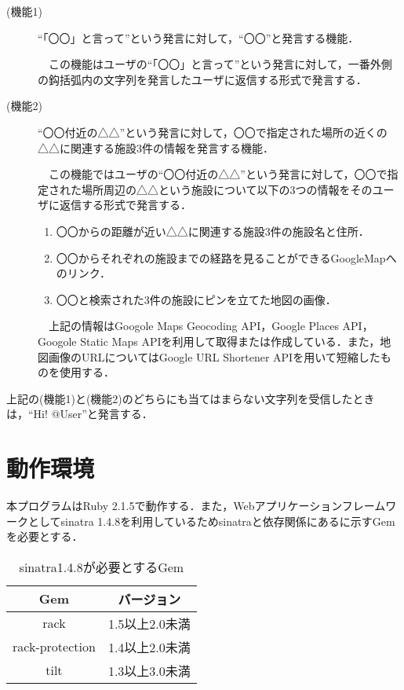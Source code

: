 \documentclass[fleqn, 14pt]{extarticlej}
\begin{document}
\begin{description}
\item[(機能1)]``「〇〇」と言って''という発言に対して，``〇〇''と発言する機能．
  
  　この機能はユーザの``「〇〇」と言って''という発言に対して，一番外側の鈎括弧内の文字列を発言したユーザに返信する形式で発言する．
\item[(機能2)]``〇〇付近の△△''という発言に対して，〇〇で指定された場所の近くの△△に関連する施設3件の情報を発言する機能．
  
  　この機能ではユーザの``〇〇付近の△△''という発言に対して，〇〇で指定された場所周辺の△△という施設について以下の3つの情報をそのユーザに返信する形式で発言する．

\begin{enumerate}
  \item 〇〇からの距離が近い△△に関連する施設3件の施設名と住所．
  \item 〇〇からそれぞれの施設までの経路を見ることができるGoogleMapへのリンク．
  \item 〇〇と検索された3件の施設にピンを立てた地図の画像． 
\end{enumerate}

　上記の情報はGoogole Maps Geocoding API，Google Places API，Googole Static Maps APIを利用して取得または作成している．また，地図画像のURLについてはGoogle URL Shortener APIを用いて短縮したものを使用する．

\end{description}

上記の(機能1)と(機能2)のどちらにも当てはまらない文字列を受信したときは，``Hi! @User''と発言する．

\section{動作環境}
本プログラムはRuby 2.1.5で動作する．また，Webアプリケーションフレームワークとしてsinatra 1.4.8を利用しているためsinatraと依存関係にあるに示すGemを必要とする．


\begin{table}[t]
  \begin{center}
    \caption{sinatra1.4.8が必要とするGem}
    \label{tab:sinatra_dependent}
    \begin{tabular}{|c|c|} \hline
      Gem & バージョン \\ \hline \hline
      rack & 1.5以上2.0未満 \\
      rack-protection & 1.4以上2.0未満 \\
      tilt & 1.3以上3.0未満 \\ \hline
    \end{tabular}
  \end{center}
\end{table}
\end{document}
